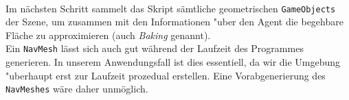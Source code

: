 \\
Im nächsten Schritt sammelt das Skript sämtliche geometrischen \texttt{GameObjects} der Szene, um zusammen mit den Informationen "uber den Agent die begehbare Fläche zu approximieren (auch \textit{Baking} genannt).
\\
Ein \texttt{NavMesh} lässt sich auch gut während der Laufzeit des Programmes generieren. In unserem Anwendungsfall ist dies essentiell, da wir die Umgebung "uberhaupt erst zur Laufzeit prozedual erstellen. Eine Vorabgenerierung des \texttt{NavMeshes} wäre daher unmöglich.

